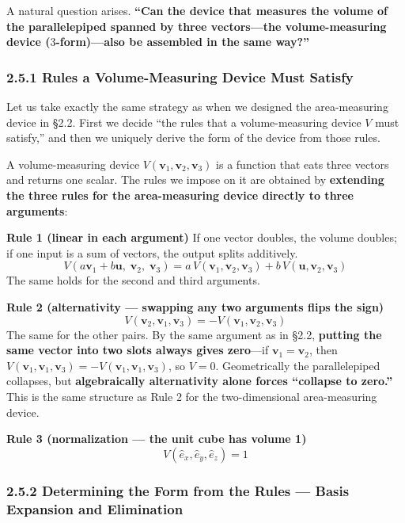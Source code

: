\documentclass[a4paper,12pt,openany]{book}
\begin{document}
A natural question arises. \textbf{``Can the device that measures the
volume of the parallelepiped spanned by three vectors—the
volume-measuring device (\(3\)-form)—also be assembled in the same
way?''}

\hypertarget{rules-a-volume-measuring-device-must-satisfy}{%
\subsubsection{2.5.1 Rules a Volume-Measuring Device Must
Satisfy}\label{rules-a-volume-measuring-device-must-satisfy}}

Let us take exactly the same strategy as when we designed the
area-measuring device in §2.2. First we decide ``the rules that a
volume-measuring device \(V\) must satisfy,'' and then we uniquely
derive the form of the device from those rules.

A volume-measuring device
\(V(\mathbf{v}_1, \mathbf{v}_2, \mathbf{v}_3)\) is a function that eats
three vectors and returns one scalar. The rules we impose on it are
obtained by
\textbf{extending the three rules for the area-measuring device directly to three arguments}:

\textbf{Rule 1 (linear in each argument)} If one vector doubles, the
volume doubles; if one input is a sum of vectors, the output splits
additively.
\[V(a\mathbf{v}_1 + b\mathbf{u},\; \mathbf{v}_2,\; \mathbf{v}_3) = a\,V(\mathbf{v}_1, \mathbf{v}_2, \mathbf{v}_3) + b\,V(\mathbf{u}, \mathbf{v}_2, \mathbf{v}_3)\]
The same holds for the second and third arguments.

\textbf{Rule 2 (alternativity — swapping any two arguments flips the sign)}
\[V(\mathbf{v}_2, \mathbf{v}_1, \mathbf{v}_3) = -V(\mathbf{v}_1, \mathbf{v}_2, \mathbf{v}_3)\]
The same for the other pairs. By the same argument as in §2.2,
\textbf{putting the same vector into two slots always gives zero}—if
\(\mathbf{v}_1 = \mathbf{v}_2\), then
\(V(\mathbf{v}_1,\mathbf{v}_1,\mathbf{v}_3) = -V(\mathbf{v}_1,\mathbf{v}_1,\mathbf{v}_3)\),
so \(V=0\). Geometrically the parallelepiped collapses, but
\textbf{algebraically alternativity alone forces “collapse to zero.”}
This is the same structure as Rule 2 for the two-dimensional
area-measuring device.

\textbf{Rule 3 (normalization — the unit cube has volume 1)}
\[V(\hat{e}_x, \hat{e}_y, \hat{e}_z) = 1\]

\hypertarget{determining-the-form-from-the-rules-basis-expansion-and-elimination}{%
\subsubsection{2.5.2 Determining the Form from the Rules — Basis
Expansion and
Elimination}\label{determining-the-form-from-the-rules-basis-expansion-and-elimination}}
\end{document}
